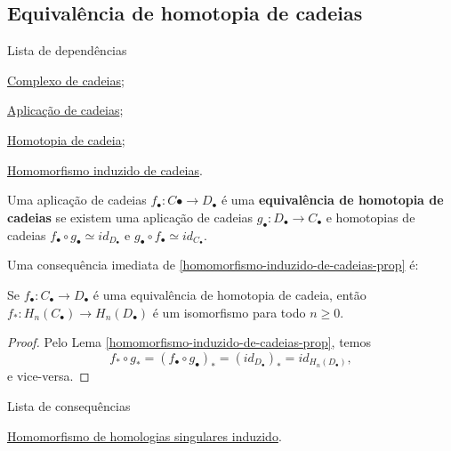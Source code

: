 \subsection{Equivalência de homotopia de cadeias} %
\label{equivalencia-de-homotopia-de-cadeias-def}
\begin{titlemize}{Lista de dependências}
	\item \hyperref[complexo-de-cadeias-def]{Complexo de cadeias};\\ 
    \item \hyperref[aplicacao-de-cadeias-def]{Aplicação de cadeias};\\
    \item \hyperref[homotopia-de-cadeias-def]{Homotopia de cadeia};\\
    \item \hyperref[homomorfismo-induzido-de-cadeias-prop]{Homomorfismo induzido de cadeias}.
\end{titlemize}

\begin{defi}
    Uma aplicação de cadeias $f_\bullet:C\bullet\rightarrow D_\bullet$ é uma \textbf{equivalência de homotopia de cadeias} se existem uma aplicação de cadeias $g_\bullet:D_\bullet\rightarrow C_\bullet$ e homotopias de cadeias $f_\bullet\circ g_\bullet\simeq id_{D_\bullet}$ e $g_\bullet\circ f_\bullet \simeq id_{C_\bullet}$.
\end{defi}

Uma consequência imediata de \ref{homomorfismo-induzido-de-cadeias-prop} é: 

\begin{lemma}
    Se $f_\bullet:C_\bullet\rightarrow D_\bullet$ é uma equivalência de homotopia de cadeia, então $f_*:H_n(C_\bullet)\rightarrow H_n(D_\bullet)$ é um isomorfismo para todo $n\ge 0$.
\end{lemma}

\begin{proof}
    Pelo Lema \ref{homomorfismo-induzido-de-cadeias-prop}, temos
    \[f_*\circ g_*=(f_\bullet\circ g_\bullet)_*=(id_{D_\bullet})_*=id_{H_n(D_\bullet)},\]
    e vice-versa. 
\end{proof}

\begin{titlemize}{Lista de consequências}
    \item \hyperref[homomorfismo-de-homologias-singulares-induzido-prop]{Homomorfismo de homologias singulares induzido}.\\
\end{titlemize}
